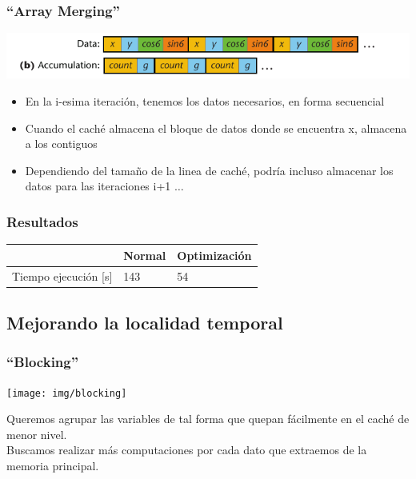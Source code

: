 \documentclass{beamer}
\begin{document}
\frame
{
\frametitle{``Array Merging''}
	\begin{center}
		\includegraphics[scale=0.6]{../informe/images/array-2.png}
	\end{center}
	\begin{itemize}
		\item En la i-esima iteración, tenemos los datos necesarios, en forma secuencial
		\item Cuando el caché almacena el bloque de datos donde se encuentra x, almacena a los contiguos
		\item Dependiendo del tamaño de la linea de caché, podría incluso almacenar los datos para las iteraciones i+1 $\ldots$
	\end{itemize}		
}


\frame
{
\frametitle{Resultados}
\begin{center}
\begin{tabular}{|l|l|l|}
\hline
& Normal & Optimización\\
\hline
Tiempo ejecución [s] & 143 & 54\\
\hline
\end{tabular}
\end{center}

}


\subsection{Mejorando la localidad temporal}
\frame
{
\frametitle{``Blocking''}
	\begin{center}
		\texttt{[image: img/blocking]}
	\end{center}
	Queremos agrupar las variables de tal forma que quepan fácilmente en el caché de menor nivel.\\
	Buscamos realizar más computaciones por cada dato que extraemos de la memoria principal.

}
\end{document}
